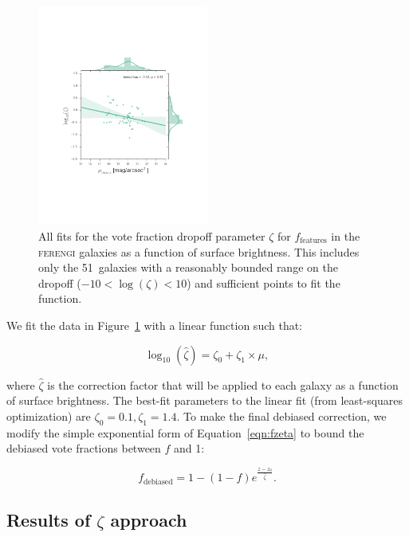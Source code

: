 \documentclass[usenatbib]{mn2e}
\newcommand{\ferengi}{\textsc{ferengi}}
\begin{document}
\begin{figure}
\begin{center}
\includegraphics[width=0.50\textwidth]{figures/zeta_mu.pdf}
\caption{All fits for the vote fraction dropoff parameter $\zeta$ for $f_\textrm{features}$ in the \ferengi{} galaxies as a function of surface brightness. This includes only the 51~galaxies with a reasonably bounded range on the dropoff ($-10<\log(\zeta)<10$) and sufficient points to fit the function.}
\label{fig:zeta_mu}
\end{center}
\end{figure}

We fit the data in Figure~\ref{fig:zeta_mu} with a linear function such that:

\begin{equation}
\log_{10}(\hat\zeta) = \zeta_0 + \zeta_1 \times \mu,
\label{eqn:zetafit}
\end{equation}

\noindent where $\hat\zeta$ is the correction factor that will be applied to each galaxy as a function of surface brightness. The best-fit parameters to the linear fit (from least-squares optimization) are $\zeta_0 = 0.1, \zeta_1=1.4$. To make the final debiased correction, we modify the simple exponential form of Equation~\ref{eqn:fzeta} to bound the debiased vote fractions between $f$ and 1:

\begin{equation}
f_\textrm{debiased} = 1 - (1 - f)e^{\frac{z-z_0}{\hat\zeta}}.
\label{eqn:fzeta_mod}
\end{equation}

\subsection{Results of $\zeta$ approach}
\end{document}
